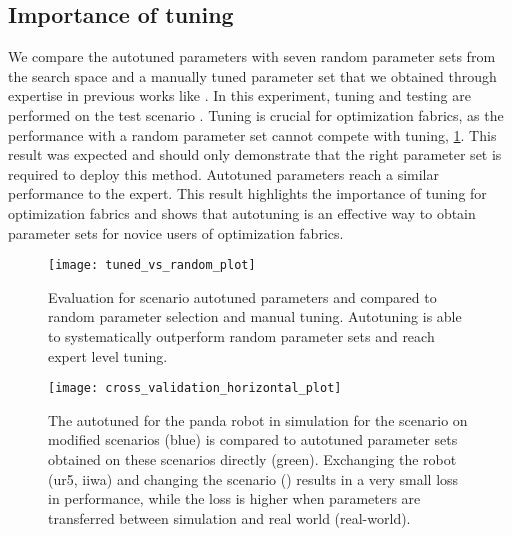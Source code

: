 \subsection{Importance of tuning}
\label{sub:importance_tuning}
%
We compare the autotuned parameters with seven random parameter sets from the
search space and a manually tuned parameter set that we obtained through
expertise in previous works like \cite{Spahn2022}.
%
In this experiment, tuning and testing are performed on the test scenario
\reachinginring{}. Tuning is crucial for optimization
fabrics, as the performance with a random parameter set cannot compete with
tuning, \cref{fig:results_manual_random_autotune}. This result was expected and
should only demonstrate that the right parameter set is required to deploy this
method. Autotuned parameters reach a similar performance to the expert. This
result highlights the importance of tuning for optimization fabrics and shows
that autotuning is an effective way to obtain parameter sets for novice users
of optimization fabrics.
%
\begin{figure}
    \centering
    \texttt{[image: tuned\_vs\_random\_plot]}
    \caption{Evaluation for scenario \reachinginring{} autotuned parameters and compared
        to random parameter selection and manual tuning. Autotuning is able to 
        systematically outperform random parameter sets and reach expert level tuning.}
    \label{fig:results_manual_random_autotune}
\end{figure}

\begin{figure}
    \centering
    \texttt{[image: cross\_validation\_horizontal\_plot]}
    \captionsetup{belowskip=-20pt}
    \caption{
        The autotuned for the panda robot in simulation for the
        \reachinginring{} scenario on modified scenarios (blue) is compared to
        autotuned parameter sets obtained on these scenarios directly (green).
        Exchanging the robot (ur5, iiwa) and changing the scenario
        (\reachingontable{}) results in a very small loss in performance, while
        the loss is higher when parameters are transferred between simulation
        and real world (real-world).
    }
    \label{fig:cross_evaluation}
\end{figure}
%
%
